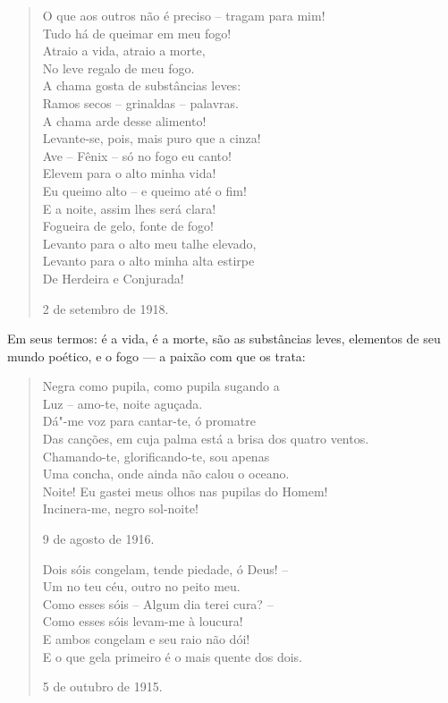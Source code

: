\begin{verse}
O que aos outros não é preciso -- tragam \qb{}para mim! \\
Tudo há de queimar em meu fogo! \\
Atraio a vida, atraio a morte, \\
No leve regalo de meu fogo. \\[8pt]
A chama gosta de substâncias leves: \\
Ramos secos -- grinaldas -- palavras. \\
A chama arde desse alimento! \\
Levante-se, pois, mais puro que a cinza! \\[8pt]
Ave -- Fênix -- só no fogo eu canto! \\
Elevem para o alto minha vida! \\
Eu queimo alto -- e queimo até o fim! \\
E a noite, assim lhes será clara! \\[8pt]
Fogueira de gelo, fonte de fogo! \\
Levanto para o alto meu talhe elevado, \\
Levanto para o alto minha alta estirpe \\
De Herdeira e Conjurada!
\begin{flushright}
2 de setembro de 1918.
\end{flushright}
\end{verse}

Em seus termos: é a vida, é a morte, são as substâncias leves, elementos
de seu mundo poético, e o fogo --- a paixão com que os trata:

\begin{verse}
Negra como pupila, como pupila sugando a \\
Luz -- amo-te, noite aguçada. \\[8pt]
Dá"-me voz para cantar-te, ó promatre \\
Das canções, em cuja palma está a brisa \qb{}dos quatro ventos. \\[8pt]
Chamando-te, glorificando-te, sou apenas \\
Uma concha, onde ainda não calou o oceano. \\[8pt]
Noite! Eu gastei meus olhos nas pupilas \qb{}do Homem! \\
Incinera-me, negro sol-noite!
\begin{flushright}
9 de agosto de 1916.
\end{flushright}

Dois sóis congelam, tende piedade, \qb{}ó Deus! -- \\
Um no teu céu, outro no peito meu. \\[8pt]
Como esses sóis -- Algum dia terei cura? -- \\
Como esses sóis levam-me à loucura! \\[8pt]
E ambos congelam e seu raio não dói! \\
E o que gela primeiro é o mais quente \qb{}dos dois.
\begin{flushright}
5 de outubro de 1915.
\end{flushright}
\end{verse}

